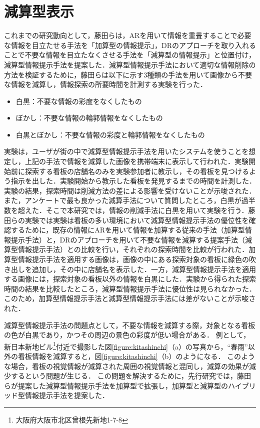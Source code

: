\section{減算型表示}
\label{section:dr_method}
  これまでの研究動向として，藤田らは，ARを用いて情報を重畳することで必要な情報を目立たせる手法を「加算型の情報提示」，DRのアプローチを取り入れることで不要な情報を目立たなくさせる手法を「減算型の情報提示」と位置付け，減算型情報提示手法を提案した\cite{Fujita:2013}．減算型情報提示手法において適切な情報削除の方法を検証するために，藤田らは以下に示す3種類の手法を用いて画像から不要な情報を減算し，情報探索の所要時間を計測する実験を行った．
  \begin{itemize}
    \item 白黒：不要な情報の彩度をなくしたもの
    \item ぼかし：不要な情報の輪郭情報をなくしたもの
    \item 白黒とぼかし：不要な情報の彩度と輪郭情報をなくしたもの
  \end{itemize}
  実験は，ユーザが街の中で減算型情報提示手法を用いたシステムを使うことを想定し，上記の手法で情報を減算した画像を携帯端末に表示して行われた．実験開始前に探索する看板の店舗名のみを実験参加者に教示し，その看板を見つけるよう指示を出した．実験開始から教示した看板を発見するまでの時間を計測した．実験の結果，探索時間は削減方法の差による影響を受けないことが示唆された．また，アンケートで最も良かった減算手法について質問したところ，白黒が過半数を超えた．そこで本研究では，情報の削減手法に白黒を用いて実験を行う．藤田らの実験では実験は看板の多い環境において減算型情報提示手法の優位性を確認するために，既存の情報にARを用いて情報を加算する従来の手法（加算型情報提示手法）と，DRのアプローチを用いて不要な情報を減算する提案手法（減算型情報提示手法）との比較を行い，それぞれの探索時間を比較が行われた．加算型情報提示手法を適用する画像は，画像の中にある探索対象の看板に緑色の吹き出しを追加し，その中に店舗名を表示した．一方，減算型情報提示手法を適用する画像には，探索対象の看板以外の情報を白黒にした．実験から得られた探索時間の結果を比較したところ，減算型情報提示手法に優位性は見られなかった．このため，加算型情報提示手法と減算型情報提示手法には差がないことが示唆された．

  減算型情報提示手法の問題点として，不要な情報を減算する際，対象となる看板の色が白黒であり，かつその周辺の景色の彩度が低い場合がある．
  例として，新日本新地ビル\footnote{大阪府大阪市北区曾根先新地1-7-8}付近で撮影した図\ref{figure:kitashinchi}（a）の写真から，``春雨''以外の看板情報を減算すると，図\ref{figure:kitashinchi}（b）のようになる．
  このような場合，看板の視覚情報が減算された周囲の視覚情報と混同し，減算の効果が減少するという問題が生じる．
  この問題を解決するために，先行研究\cite{Kitamura:2017a, Kitamura:2017b}では，藤田らが提案した減算型情報提示手法を加算型で拡張し，加算型と減算型のハイブリッド型情報提示手法を提案した．

